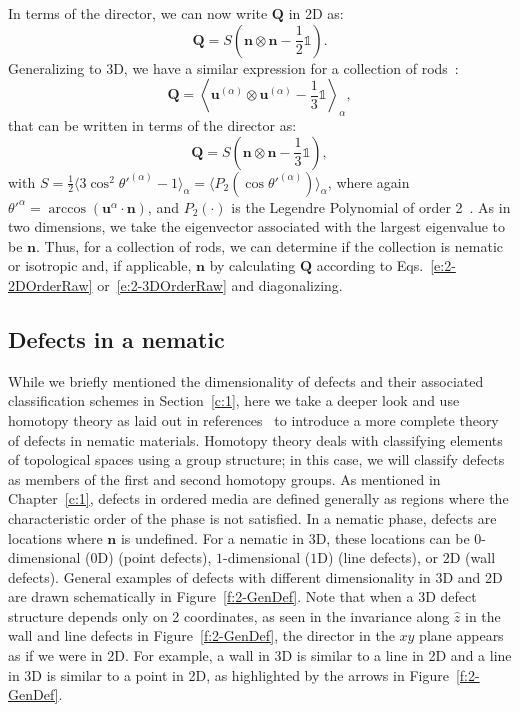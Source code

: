 In terms of the director, we can now write $\mathbf{Q}$ in 2D as:
\begin{equation}
  \mathbf{Q} = S \left ( \mathbf{n} \otimes \mathbf{n} - \frac{1}{2}\mathbb{1} \right ).\label{e:2-2DOrderDiag}
\end{equation}
Generalizing to 3D, we have a similar expression for a collection of rods~\cite{RN33}:
\begin{equation}
  \mathbf{Q} =  \left \langle \mathbf{u}^{(\alpha)} \otimes \mathbf{u}^{(\alpha)} - \frac{1}{3} \mathbb{1} \right \rangle_{\alpha},\label{e:2-3DOrderRaw}
\end{equation}
that can be written in terms of the director as:
\begin{equation}
  \mathbf{Q} = S \left ( \mathbf{n} \otimes \mathbf{n} - \frac{1}{3}\mathbb{1} \right ),\label{e:2-3DOrderDiag}
\end{equation}
with $S = \frac{1}{2} \big \langle 3 \cos^2 \theta'^{(\alpha)}  - 1 \big  \rangle_{\alpha} = \big \langle P_2(\cos \theta'^{(\alpha)}) \big \rangle_{\alpha} $,
where again $\theta'^{\alpha} = \arccos (\mathbf{u}^{\alpha} \cdot \mathbf{n})$, and $P_2(\cdot)$ is the Legendre Polynomial of order 2~\cite{RN33,RN175}.
As in two dimensions, we take the eigenvector associated with the largest eigenvalue to be $\mathbf{n}$.
Thus, for a collection of rods, we can determine if the collection is nematic or isotropic and, if applicable, $\mathbf{n}$ by calculating $\mathbf{Q}$ according to Eqs.~\ref{e:2-2DOrderRaw} or~\ref{e:2-3DOrderRaw} and diagonalizing.


\subsection{Defects in a nematic}\label{c:2-defects}
While we briefly mentioned the dimensionality of defects and their associated classification schemes in Section~\ref{c:1}, here we take a deeper look and use homotopy theory as laid out in references~\cite{RN196,RN236,RN153} to introduce a more complete theory of defects in nematic materials.
Homotopy theory deals with classifying elements of topological spaces using a group structure; in this case, we will classify defects as members of the first and second homotopy groups.
As mentioned in Chapter~\ref{c:1}, defects in ordered media are defined generally as regions where the characteristic order of the phase is not satisfied.
In a nematic phase, defects are locations where $\mathbf{n}$ is undefined.
For a nematic in 3D, these locations can be $0$-dimensional ($0$D) (point defects), $1$-dimensional ($1$D) (line defects), or $2$D (wall defects).
General examples of defects with different dimensionality in 3D and 2D are drawn schematically in Figure~\ref{f:2-GenDef}.
Note that when a 3D defect structure depends only on 2 coordinates, as seen in the invariance along $\hat{z}$ in the wall and line defects in Figure~\ref{f:2-GenDef}, the director in the $xy$ plane appears as if we were in 2D.
For example, a wall in 3D is similar to a line in 2D and a line in 3D is similar to a point in 2D, as highlighted by the arrows in Figure~\ref{f:2-GenDef}.

